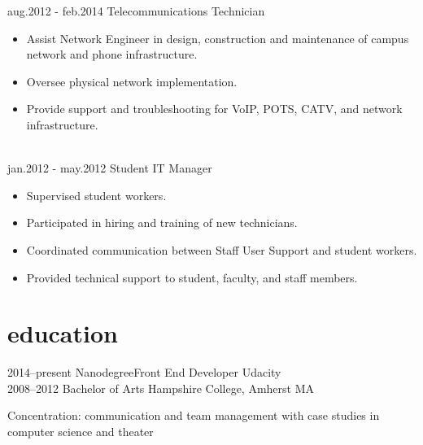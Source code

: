 \documentclass[]{friggeri-cv} %
\begin{document}
\begin{entrylist}
\entry
{aug.2012 - feb.2014}
{Telecommunications Technician}{}
{\begin{itemize}[leftmargin=*,topsep=0pt]
\item Assist Network Engineer in design, construction and maintenance of campus network and phone infrastructure.
\item Oversee physical network implementation.
\item Provide support and troubleshooting for VoIP, POTS, CATV, and network infrastructure.
\end{itemize}}
\\
\entry
{jan.2012 - may.2012}
{Student IT Manager}{}
{\begin{itemize}[leftmargin=*,topsep=0pt]
\item Supervised student workers.
\item Participated in hiring and training of new technicians.
\item Coordinated communication between Staff User Support and student workers.
\item Provided technical support to student, faculty, and staff members.
\end{itemize}}
\end{entrylist}


\section{education}

\begin{entrylist}
\entry
{2014--present}
{Nanodegree}{Front End Developer}
{Udacity}
\\
\entry
{2008--2012}
{Bachelor of Arts}{}
{Hampshire College, Amherst MA}

\entry
{\mediumitalic Concentration:}
{\normalfont communication and team management with case studies in computer science and theater}{}{}
\end{entrylist}
\end{document}
